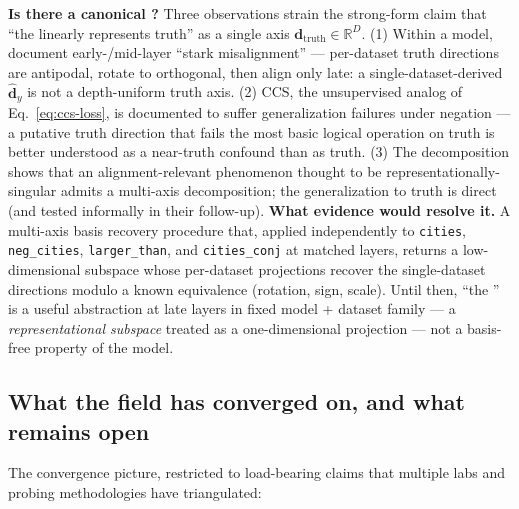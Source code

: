 \begin{contradiction}
\textbf{Is there a canonical ?} Three observations
strain the strong-form claim that ``the  linearly represents
truth'' as a single axis $\mathbf{d}_\mathrm{truth} \in \mathbb{R}^D$.
\textsf{(1)} Within a model,
\citet[\S 4]{marks-tegmark-2023-truth} document early-/mid-layer
``stark misalignment'' --- per-dataset truth directions are
antipodal, rotate to orthogonal, then align only late: a
single-dataset-derived $\hat{\mathbf{d}}_y$ is not a depth-uniform
truth axis. \textsf{(2)} CCS, the unsupervised analog of
Eq.~\eqref{eq:ccs-loss}, is documented to suffer generalization
failures under negation \citep[\S 1.1]{marks-tegmark-2023-truth}
 --- a putative truth
direction that fails the most basic logical operation on truth is
better understood as a near-truth confound than as truth.
\textsf{(3)} The
\citet{vennemeyer2025-sycophancy-not-one-thing} 
decomposition shows that an alignment-relevant phenomenon thought to
be representationally-singular admits a multi-axis decomposition; the
generalization to truth is direct (and tested informally in their
follow-up). \textbf{What evidence would resolve it.} A multi-axis
basis recovery procedure that, applied independently to
\texttt{cities}, \texttt{neg\_cities}, \texttt{larger\_than}, and
\texttt{cities\_conj} at matched layers, returns a low-dimensional
subspace whose per-dataset projections recover the
single-dataset directions modulo a known equivalence (rotation,
sign, scale). Until then, ``the '' is a useful
abstraction at late layers in fixed model + dataset family --- a
\emph{representational subspace} treated as a one-dimensional
projection --- not a basis-free property of the model.
\end{contradiction}

\subsection{What the field has converged on, and what remains open}
\label{sec:truth-frontier}

The convergence picture, restricted to load-bearing claims that
multiple labs and probing methodologies have triangulated:

